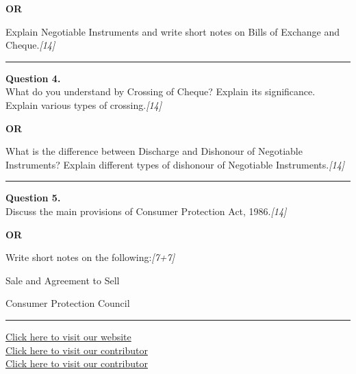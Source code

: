 \documentclass[11pt,a4paper]{article}
\newcommand{\pts}[1]{\hfill   \textit{[#1]}}
\begin{document}
\centerline{   \textbf{OR}}

Explain Negotiable Instruments and write short notes on Bills of Exchange and Cheque.\pts{14}

\medskip\rule{\linewidth}{0.2pt}




\noindent   \textbf{Question 4.} \\
What do you understand by Crossing of Cheque? Explain its significance. Explain various types of crossing.\pts{14}

\centerline{   \textbf{OR}}

What is the difference between Discharge and Dishonour of Negotiable Instruments? Explain different types of dishonour of Negotiable Instruments.\pts{14}

\medskip\rule{\linewidth}{0.2pt}




\noindent   \textbf{Question 5.} \\
Discuss the main provisions of Consumer Protection Act, 1986.\pts{14}

\centerline{   \textbf{OR}}

Write short notes on the following:\pts{7+7}

\begin{parts}
  \item Sale and Agreement to Sell
  \item Consumer Protection Council
\end{parts}

\vfill
\rule{\linewidth}{0.4pt}

\begin{center}\small
  \href{https://bhu-exam.vercel.app/}{Click here to visit our website}\\[4pt]
  \href{https://me-aryan.vercel.app/}{Click here to visit our contributor}\\[4pt]
  \href{https://quashan-me.vercel.app/}{Click here to visit our contributor}
\end{center}
\end{document}
